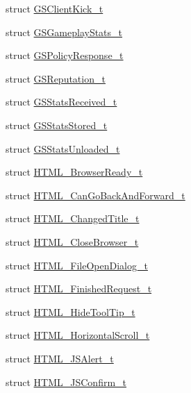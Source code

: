\begin{DoxyCompactItemize}
struct \hyperlink{struct_valve_1_1_steamworks_1_1_g_s_client_kick__t}{G\+S\+Client\+Kick\+\_\+t}
\item 
struct \hyperlink{struct_valve_1_1_steamworks_1_1_g_s_gameplay_stats__t}{G\+S\+Gameplay\+Stats\+\_\+t}
\item 
struct \hyperlink{struct_valve_1_1_steamworks_1_1_g_s_policy_response__t}{G\+S\+Policy\+Response\+\_\+t}
\item 
struct \hyperlink{struct_valve_1_1_steamworks_1_1_g_s_reputation__t}{G\+S\+Reputation\+\_\+t}
\item 
struct \hyperlink{struct_valve_1_1_steamworks_1_1_g_s_stats_received__t}{G\+S\+Stats\+Received\+\_\+t}
\item 
struct \hyperlink{struct_valve_1_1_steamworks_1_1_g_s_stats_stored__t}{G\+S\+Stats\+Stored\+\_\+t}
\item 
struct \hyperlink{struct_valve_1_1_steamworks_1_1_g_s_stats_unloaded__t}{G\+S\+Stats\+Unloaded\+\_\+t}
\item 
struct \hyperlink{struct_valve_1_1_steamworks_1_1_h_t_m_l___browser_ready__t}{H\+T\+M\+L\+\_\+\+Browser\+Ready\+\_\+t}
\item 
struct \hyperlink{struct_valve_1_1_steamworks_1_1_h_t_m_l___can_go_back_and_forward__t}{H\+T\+M\+L\+\_\+\+Can\+Go\+Back\+And\+Forward\+\_\+t}
\item 
struct \hyperlink{struct_valve_1_1_steamworks_1_1_h_t_m_l___changed_title__t}{H\+T\+M\+L\+\_\+\+Changed\+Title\+\_\+t}
\item 
struct \hyperlink{struct_valve_1_1_steamworks_1_1_h_t_m_l___close_browser__t}{H\+T\+M\+L\+\_\+\+Close\+Browser\+\_\+t}
\item 
struct \hyperlink{struct_valve_1_1_steamworks_1_1_h_t_m_l___file_open_dialog__t}{H\+T\+M\+L\+\_\+\+File\+Open\+Dialog\+\_\+t}
\item 
struct \hyperlink{struct_valve_1_1_steamworks_1_1_h_t_m_l___finished_request__t}{H\+T\+M\+L\+\_\+\+Finished\+Request\+\_\+t}
\item 
struct \hyperlink{struct_valve_1_1_steamworks_1_1_h_t_m_l___hide_tool_tip__t}{H\+T\+M\+L\+\_\+\+Hide\+Tool\+Tip\+\_\+t}
\item 
struct \hyperlink{struct_valve_1_1_steamworks_1_1_h_t_m_l___horizontal_scroll__t}{H\+T\+M\+L\+\_\+\+Horizontal\+Scroll\+\_\+t}
\item 
struct \hyperlink{struct_valve_1_1_steamworks_1_1_h_t_m_l___j_s_alert__t}{H\+T\+M\+L\+\_\+\+J\+S\+Alert\+\_\+t}
\item 
struct \hyperlink{struct_valve_1_1_steamworks_1_1_h_t_m_l___j_s_confirm__t}{H\+T\+M\+L\+\_\+\+J\+S\+Confirm\+\_\+t}

\end{DoxyCompactItemize}
